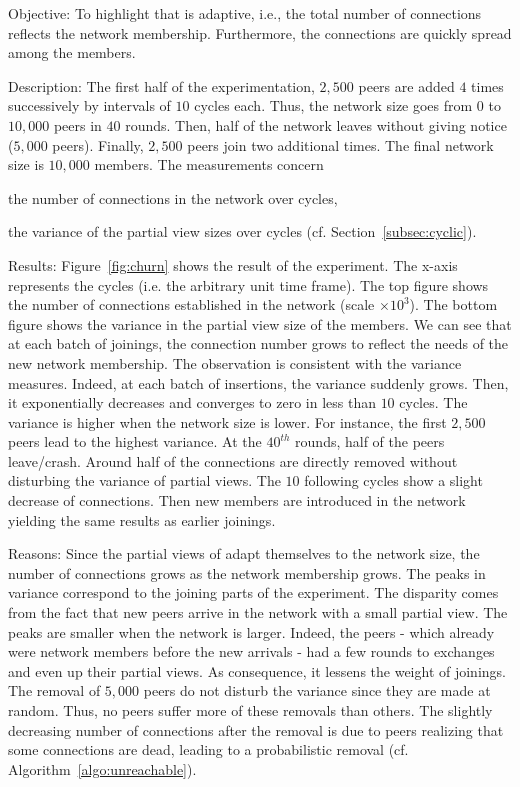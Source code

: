 \begin{asparadesc}
\item[Objective:] To highlight that \SPRAY{} is adaptive, i.e., the total
  number of connections reflects the network membership. Furthermore, the
  connections are quickly spread among the members.
\item[Description:] The first half of the experimentation, $2,500$ peers are
  added $4$ times successively by intervals of $10$ cycles each. Thus, the
  network size goes from $0$ to $10,000$ peers in $40$ rounds. Then, half of
  the network leaves without giving notice ($5,000$ peers). Finally, $2,500$
  peers join two additional times. The final network size is $10,000$
  members. The measurements concern
  \begin{inparaenum}
  \item the number of connections in the network over cycles,
  \item the variance of the partial view sizes over cycles
    (cf. Section~\ref{subsec:cyclic}).
  \end{inparaenum}
\item[Results:] Figure~\ref{fig:churn} shows the result of the experiment. The
  x-axis represents the cycles (i.e. the arbitrary unit time frame). The top
  figure shows the number of connections established in the network (scale
  $\times 10^3$). The bottom figure shows the variance in the partial view size
  of the members. We can see that at each batch of joinings, the connection
  number grows to reflect the needs of the new network membership. The
  observation is consistent with the variance measures. Indeed, at each batch
  of insertions, the variance suddenly grows. Then, it exponentially decreases
  and converges to zero in less than $10$ cycles. The variance is higher when
  the network size is lower. For instance, the first $2,500$ peers lead to the
  highest variance. At the $40^{th}$ rounds, half of the peers
  leave/crash. Around half of the connections are directly removed without
  disturbing the variance of partial views. The $10$ following cycles show a
  slight decrease of connections. Then new members are introduced in the
  network yielding the same results as earlier joinings.
\item[Reasons:] Since the partial views of \SPRAY{} adapt themselves to the
  network size, the number of connections grows as the network membership
  grows.  The peaks in variance correspond to the joining parts of the
  experiment. The disparity comes from the fact that new peers arrive in the
  network with a small partial view. The peaks are smaller when the network is
  larger. Indeed, the peers - which already were network members before the new
  arrivals - had a few rounds to exchanges and even up their partial views. As
  consequence, it lessens the weight of joinings. The removal of $5,000$ peers
  do not disturb the variance since they are made at random. Thus, no peers
  suffer more of these removals than others. The slightly decreasing number of
  connections after the removal is due to peers realizing that some connections
  are dead, leading to a probabilistic removal
  (cf. Algorithm~\ref{algo:unreachable}).
\end{asparadesc}


